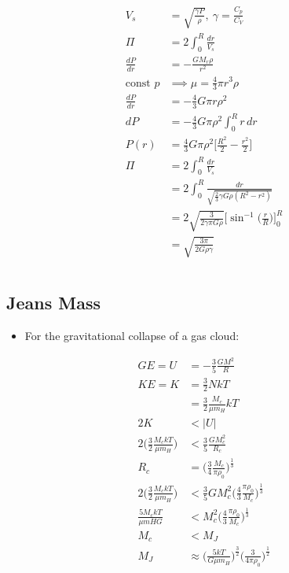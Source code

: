 \documentclass[a4paper,11pt,normalem]{article}
\begin{document}
\begin{align*}
    V_s &= \sqrt{\frac{\gamma P}{\rho}}, ~ \gamma = \frac{C_p}{C_V} \\
    \Pi &= 2\int_0^R \frac{dr}{V_s} \\
    \frac{dP}{dr} &= -\frac{GM_r \rho}{r^2} \\
    \text{const } p &\implies \mu = \frac{4}{3}\pi r^3 \rho \\
    \frac{dP}{dr} &= -\frac{4}{3}G\pi r \rho^2 \\
    dP &= -\frac{4}{3}G\pi\rho^2 \int_0^R r\,dr \\
    P(r) &= \frac{4}{3}G\pi\rho^2 \bigg[\frac{R^2}{2} - \frac{r^2}{2}\bigg] \\
    \Pi &= 2 \int_0^R \frac{dr}{V_s} \\
    &= 2\int_0^R \frac{dr}{\sqrt{\frac{2}{3}\gamma G\rho (R^2 - r^2)}} \\
    &= 2\sqrt{\frac{3}{2\gamma\pi G \rho}} \Bigg[\sin^{-1} \bigg(\frac{r}{R}\bigg)\Bigg]^{R}_{0} \\
    &= \sqrt{\frac{3\pi}{2G\rho\gamma}}
\end{align*}

\section{}

\subsection{Jeans Mass}

\begin{itemize}
    \item For the gravitational collapse of a gas cloud:
\end{itemize}
\begin{align*}
    GE = U &= -\frac{3}{5}\frac{GM^2}{R} \\
    KE = K &= \frac{3}{2}NkT \\
    &= \frac{3}{2}\frac{M_c}{\mu m_H}kT \\
    2K &< |U| \\
    2\Bigg(\frac{3}{2}\frac{M_c kT}{\mu m_H}\Bigg) &< \frac{3}{5}\frac{GM_c^2}{R_c} \\
    R_c &= \Bigg(\frac{3}{4}\frac{M_c}{\pi \rho_0}\Bigg)^{\frac{1}{3}} \\
    2\Bigg(\frac{3}{2}\frac{M_c kT}{\mu m_H}\Bigg) &< \frac{3}{5}GM_c^2 \Bigg(\frac{4}{3}\frac{\pi \rho_0}{M_c}\Bigg)^{\frac{1}{3}} \\
    \frac{5M_c kT}{\mu mH G} &< M_c^2 \Bigg(\frac{4}{3}\frac{\pi \rho_0}{M_c}\Bigg)^{\frac{1}{3}} \\
    M_c &< M_J \\
    M_J &\approx \Bigg(\frac{5kT}{G\mu m_H}\Bigg)^{\frac{3}{2}} \Bigg(\frac{3}{4\pi\rho_0}\Bigg)^{\frac{1}{2}}
\end{align*}
\end{document}
